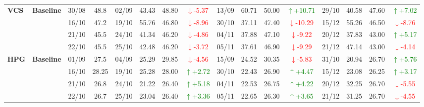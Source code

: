 {\begin{longtable}{llcc|cccc|cccc|cccc}
\multirow{4}{*}{\textbf{VCS}}
& \textbf{Baseline}
& 30/08 & 48.8 & 02/09 & 43.43 & 48.80 & \textcolor{red}{\(\downarrow\)-5.37} & 13/09 & 60.71 & 50.00 & \textcolor{green}{\(\uparrow\)+10.71} & 29/10 & 40.58 & 47.60 & \textcolor{green}{\(\uparrow\)+7.02} \\
& & 16/10 & 47.2 & 19/10 & 55.76 & 46.80 & \textcolor{red}{\(\downarrow\)-8.96} & 30/10 & 37.11 & 47.40 & \textcolor{red}{\(\downarrow\)-10.29} & 15/12 & 55.26 & 46.50 & \textcolor{red}{\(\downarrow\)-8.76} \\
& & 21/10 & 45.5 & 24/10 & 41.34 & 46.20 & \textcolor{red}{\(\downarrow\)-4.86} & 04/11 & 37.88 & 47.10 & \textcolor{red}{\(\downarrow\)-9.22} & 20/12 & 37.83 & 43.00 & \textcolor{green}{\(\uparrow\)+5.17} \\
& & 22/10 & 45.5 & 25/10 & 42.48 & 46.20 & \textcolor{red}{\(\downarrow\)-3.72} & 05/11 & 37.61 & 46.90 & \textcolor{red}{\(\downarrow\)-9.29} & 21/12 & 47.14 & 43.00 & \textcolor{red}{\(\downarrow\)-4.14} \\
\midrule

\multirow{4}{*}{\textbf{HPG}}
& \textbf{Baseline}
& 01/09 & 27.5 & 04/09 & 25.29 & 29.85 & \textcolor{red}{\(\downarrow\)-4.56} & 15/09 & 24.52 & 30.35 & \textcolor{red}{\(\downarrow\)-5.83} & 31/10 & 20.94 & 26.70 & \textcolor{green}{\(\uparrow\)+5.76} \\
& & 16/10 & 28.25 & 19/10 & 25.28 & 28.00 & \textcolor{green}{\(\uparrow\)+2.72} & 30/10 & 22.43 & 26.90 & \textcolor{green}{\(\uparrow\)+4.47} & 15/12 & 23.08 & 26.25 & \textcolor{green}{\(\uparrow\)+3.17} \\
& & 21/10 & 26.8 & 24/10 & 21.22 & 26.40 & \textcolor{green}{\(\uparrow\)+5.18} & 04/11 & 22.53 & 26.75 & \textcolor{green}{\(\uparrow\)+4.22} & 20/12 & 32.25 & 26.70 & \textcolor{red}{\(\downarrow\)-5.55} \\
& & 22/10 & 26.7 & 25/10 & 23.04 & 26.40 & \textcolor{green}{\(\uparrow\)+3.36} & 05/11 & 22.65 & 26.30 & \textcolor{green}{\(\uparrow\)+3.65} & 21/12 & 31.25 & 26.70 & \textcolor{red}{\(\downarrow\)-4.55} \\
\midrule


\end{longtable}}
